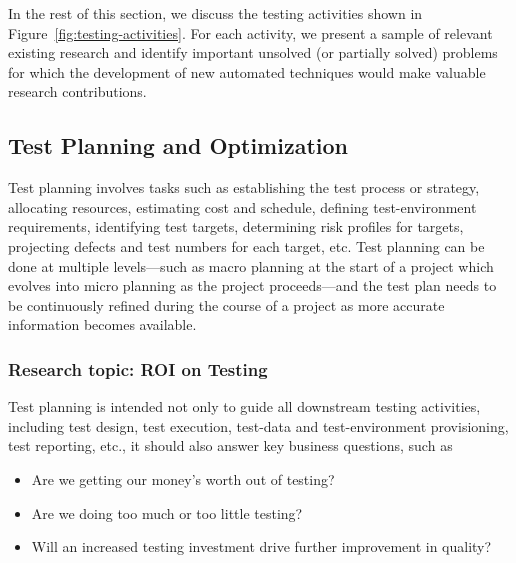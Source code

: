 In the rest of this section, we discuss the testing activities shown in
Figure~\ref{fig:testing-activities}. For each activity, we present a sample of
relevant existing research and identify important unsolved (or partially solved)
problems for which the development of new automated techniques would make
valuable research contributions.

\subsection{Test Planning and Optimization}
\label{sec:test-planning}

Test planning involves tasks such as establishing the test process or strategy,
allocating resources, estimating cost and schedule, defining test-environment
requirements, identifying test targets, determining risk profiles for targets,
projecting defects and test numbers for each target, etc.  Test planning can be
done at multiple levels---such as macro planning at the start of a project which
evolves into micro planning as the project proceeds---and the test plan needs to
be continuously refined during the course of a project as more accurate
information becomes available.

\subsubsection*{Research topic: ROI on Testing}

Test planning is intended not only to guide all downstream testing activities,
including test design, test execution, test-data and test-environment
provisioning, test reporting, etc., it should also answer key business
questions, such as~\cite{Kagan:NextGenTesting}

\begin{itemize}
\denseitems


\item Are we getting our money's worth out of testing?

\item Are we doing too much or too little testing?

\item Will an increased testing investment drive further improvement in quality?


\end{itemize}

